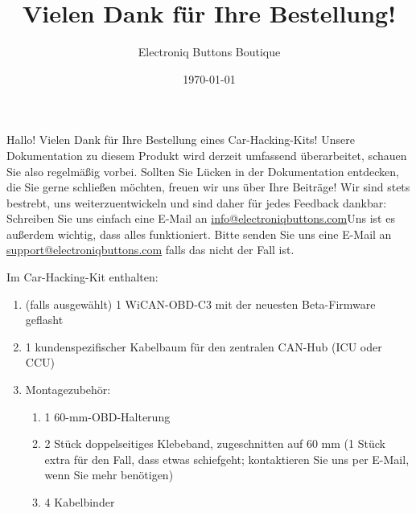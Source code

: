 \documentclass[superscriptaddress,onecolumn,floatfix]{revtex4-2}
\makeatletter
\DeclareRobustCommand{\selectlanguage}[1]{%
    \@ifundefined{alias@\string#1}
      {\ORIGselectlanguage{#1}}
      {\begingroup\edef\x{\endgroup
         \noexpand\ORIGselectlanguage{\@nameuse{alias@#1}}}\x}%
}
\makeatother
\begin{document}
\selectlanguage{de}

\title{Vielen Dank für Ihre Bestellung!}
\author{Electroniq Buttons Boutique}
\date{\today}

\maketitle

Hallo! Vielen Dank für Ihre Bestellung eines Car-Hacking-Kits! Unsere Dokumentation zu diesem Produkt wird derzeit umfassend überarbeitet, schauen Sie also regelmäßig vorbei. Sollten Sie Lücken in der Dokumentation entdecken, die Sie gerne schließen möchten, freuen wir uns über Ihre Beiträge! Wir sind stets bestrebt, uns weiterzuentwickeln und sind daher für jedes Feedback dankbar: Schreiben Sie uns einfach eine E-Mail an \href{mailto:info@electroniqbuttons.com}{info@electroniqbuttons.com}Uns ist es außerdem wichtig, dass alles funktioniert. Bitte senden Sie uns eine E-Mail an \href{mailto:support@electroniqbuttons.com}{support@electroniqbuttons.com} falls das nicht der Fall ist. 

Im Car-Hacking-Kit enthalten:
{\small
\begin{enumerate}
  \item (falls ausgewählt) 1 WiCAN-OBD-C3 mit der neuesten Beta-Firmware geflasht
  \item 1 kundenspezifischer Kabelbaum für den zentralen CAN-Hub (ICU oder CCU)
  \item Montagezubehör: 
    \begin{enumerate}
      \item 1 60-mm-OBD-Halterung
      \item 2 Stück doppelseitiges Klebeband, zugeschnitten auf 60 mm (1 Stück extra für den Fall, dass etwas schiefgeht; kontaktieren Sie uns per E-Mail, wenn Sie mehr benötigen)
      \item 4 Kabelbinder
    \end{enumerate}
\end{enumerate}
}
\end{document}
